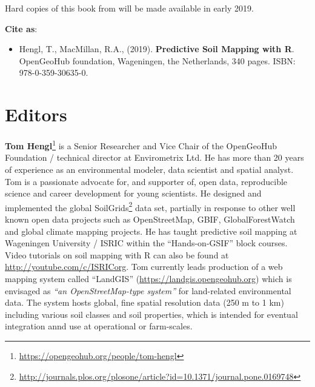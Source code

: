 \documentclass[graybox,natbib,nospthms,UStrade]{svmono}
\providecommand{\tightlist}{%
  \setlength{\itemsep}{0pt}\setlength{\parskip}{0pt}}
\providecommand{\tightlist}{\setlength{\itemsep}{0pt}\setlength{\parskip}{0pt}}
\renewcommand{\href}[2]{#2 (\url{#1})}
\renewcommand{\href}[2]{#2\footnote{\url{#1}}}
\begin{document}
Hard copies of this book from will be made available in early 2019.

\textbf{Cite as}:

\begin{itemize}
\tightlist
\item
  Hengl, T., MacMillan, R.A., (2019). \textbf{Predictive Soil Mapping with R}. OpenGeoHub foundation, Wageningen, the Netherlands, 340 pages. ISBN: 978-0-359-30635-0.
\end{itemize}

\hypertarget{editors}{%
\section*{Editors}\label{editors}}

\href{https://opengeohub.org/people/tom-hengl}{\textbf{Tom Hengl}} is a Senior Researcher and Vice Chair of the OpenGeoHub Foundation / technical director at Envirometrix Ltd.
He has more than 20 years of experience as an environmental modeler, data scientist and spatial analyst.
Tom is a passionate advocate for, and supporter of, open data, reproducible science and career development
for young scientists. He designed and implemented the global \href{http://journals.plos.org/plosone/article?id=10.1371/journal.pone.0169748}{SoilGrids} data set,
partially in response to other well known open data projects such as OpenStreetMap, GBIF, GlobalForestWatch
and global climate mapping projects. He has taught predictive soil mapping at Wageningen University /
ISRIC within the ``Hands-on-GSIF'' block courses. Video tutorials on soil mapping with R can also be
found at \url{http://youtube.com/c/ISRICorg}. Tom currently leads production of a web mapping system called ``LandGIS'' (\url{https://landgis.opengeohub.org}) which is envisaged as \emph{``an OpenStreetMap-type system''} for land-related environmental data. The system hosts global, fine spatial resolution data (250 m to 1 km) including various soil classes and soil properties, which is intended for eventual integration annd use at operational or farm-scales.
\end{document}
